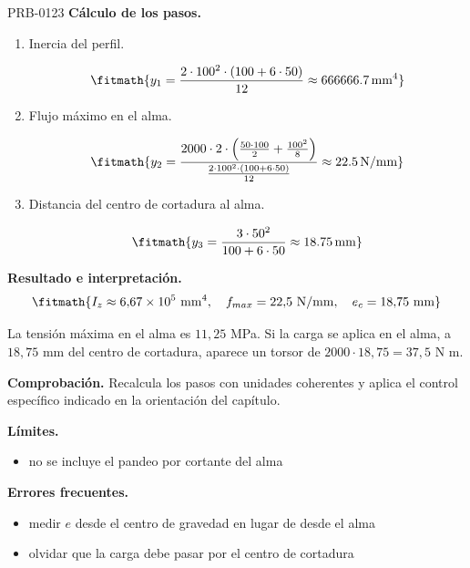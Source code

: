 \begin{studiumworked}{PRB-0123}
\textbf{Cálculo de los pasos.}

\begin{enumerate}

\item Inercia del perfil.

\[\fitmath{y_{1}=\frac{2\cdot {100}^{2}\cdot \left(100+6\cdot 50\right)}{12}\approx 666666.7\,\mathrm{mm^{4}}}\]

\item Flujo máximo en el alma.

\[\fitmath{y_{2}=\frac{2000\cdot 2\cdot \left(\frac{50\cdot 100}{2}+\frac{{100}^{2}}{8}\right)}{\frac{2\cdot {100}^{2}\cdot \left(100+6\cdot 50\right)}{12}}\approx 22.5\,\mathrm{N/mm}}\]

\item Distancia del centro de cortadura al alma.

\[\fitmath{y_{3}=\frac{3\cdot {50}^{2}}{100+6\cdot 50}\approx 18.75\,\mathrm{mm}}\]

\end{enumerate}

\textbf{Resultado e interpretación.}\[\fitmath{I_z \approx 6{,}67\times 10^{5}\ \mathrm{mm}^{4},\quad f_{max} = 22{,}5\ \mathrm{N/mm},\quad e_c = 18{,}75\ \mathrm{mm}}\]

La tensión máxima en el alma es $11{,}25$ MPa. Si la carga se aplica en el alma, a $18{,}75$ mm del centro de cortadura, aparece un torsor de $2000\cdot 18{,}75 = 37{,}5$ N m.

\par\textbf{Comprobación.} Recalcula los pasos con unidades coherentes y aplica el control específico indicado en la orientación del capítulo.

\textbf{Límites.}\begin{itemize}\item no se incluye el pandeo por cortante del alma\end{itemize}

\textbf{Errores frecuentes.}\begin{itemize}\item medir $e$ desde el centro de gravedad en lugar de desde el alma
\item olvidar que la carga debe pasar por el centro de cortadura\end{itemize}

\end{studiumworked}

\Needspace{.3\textheight}

